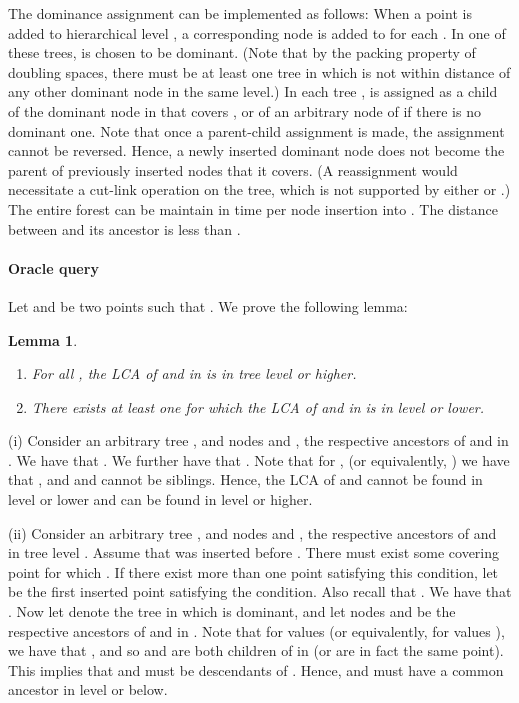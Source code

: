\documentclass[11pt]{article}
\newtheorem{lemma}[theorem]{Lemma}
\newenvironment{proof}{{\bf Proof:\ }}{\hfill\medskip}
\begin{document}
The dominance assignment can be implemented as follows: When a
point  is added to hierarchical level , a corresponding
node  is added to  for each . In one
of these trees,  is chosen to be dominant. (Note that by the
packing property of doubling spaces, there must be at least one
tree in which  is not within distance  of any other
dominant node in the same level.) In each tree ,
 is assigned as a child of the dominant node in  that
covers , or of an arbitrary node of  if there is no dominant one.
Note that once a parent-child assignment is made, the assignment
cannot be reversed. Hence, a newly inserted dominant node does
not become the parent of previously inserted nodes that it covers.
(A reassignment would necessitate a cut-link operation on the tree,
which is not supported by either \cite{CoGo06} or \cite{CoHa05}.)
The entire forest  can be maintain in time  per node
insertion into .
The distance between  and its ancestor  is less than
.

\paragraph{Oracle query}
Let  and  be two points such that
.
We prove the following lemma:

\begin{lemma}\label{L-bad-approximation}
\renewcommand{\labelenumi}{(\roman{enumi})}
\begin{enumerate}
\item For all , the LCA of  and  in 
is in tree level  or higher.

\item There exists at least one  for which the
LCA of  and  in  is in level  or lower.
\end{enumerate}
\end{lemma}

\begin{proof}
\noindent (i) Consider an arbitrary tree , and
nodes  and , the respective ancestors of  and  in
. We have that .
We further have that
.
Note that for ,
(or equivalently, ) we have that
, and  and  cannot be
siblings. Hence, the LCA of  and  cannot be found in level
 or lower and can be found in level  or higher.

\smallskip
\noindent (ii) Consider an arbitrary tree , and
nodes  and , the respective ancestors of  and  in
tree level . Assume that  was inserted before . 
There must exist some covering point  for which
.
If there exist more than one point satisfying this condition, let
 be the first inserted point satisfying the condition. Also recall that
.
We have that
.
Now let  denote the tree in which  is dominant, and let nodes
 and  be the respective ancestors of  and  in .
Note that for values  (or equivalently, for values ), we have that , and so
 and  are both children of  in  (or are in fact
the same point). This implies that  and  must be descendants
of . Hence,  and  must have a common ancestor in level
 or below.
\end{proof}
\end{document}
